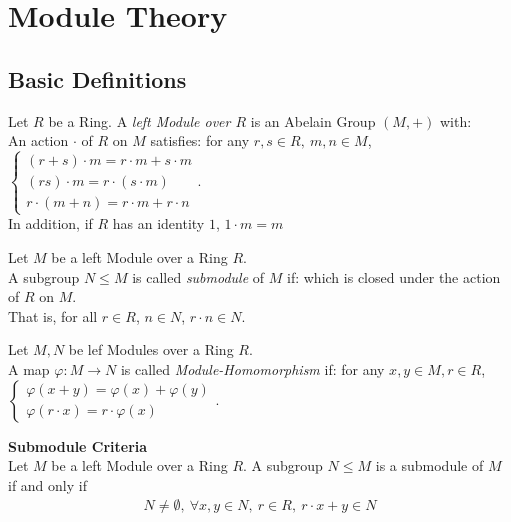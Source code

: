 \chapter{Module Theory}

\section{Basic Definitions}

\begin{definition}
    Let $R$ be a Ring. A \textit{left Module over $R$} is an Abelain Group $(M, +)$ with: \\
        An action $\cdot$ of $R$ on $M$ satisfies: for any $r,s \in R,\ m,n \in M$,
        $\begin{cases}
            (r + s) \cdot m = r \cdot m + s \cdot m \\
            (r s) \cdot m = r \cdot (s \cdot m) \\
            r \cdot (m + n) = r \cdot m + r \cdot n 
        \end{cases}$. \\
    In addition, if $R$ has an identity $1$, $1 \cdot m = m$
\end{definition}

\begin{definition}
    Let $M$ be a left Module over a Ring $R$. \\
    A subgroup $N \leq M$ is called \textit{submodule} of $M$ if: which is closed under the action of $R$ on $M$. \\
    That is, for all $r \in R$, $n \in N$, $r \cdot n \in N$.
\end{definition}

\begin{definition}
    Let $M, N$ be lef Modules over a Ring $R$. \\
    A map $\varphi:M \to N$ is called \textit{Module-Homomorphism} if: for any $x,y \in M, r \in R$,
    $\begin{cases}
        \varphi(x + y) = \varphi(x) + \varphi(y) \\
        \varphi(r \cdot x) = r \cdot \varphi(x)
    \end{cases}$.
\end{definition}

\begin{lemma}
    \textbf{Submodule Criteria} \\
    Let $M$ be a left Module over a Ring $R$. A subgroup $N \leq M$ is a submodule of $M$ if and only if
    \begin{align*}
        N \neq \emptyset,\
        \forall x, y \in N,\ r \in R,\ r \cdot x + y \in N
    \end{align*}
\end{lemma}



